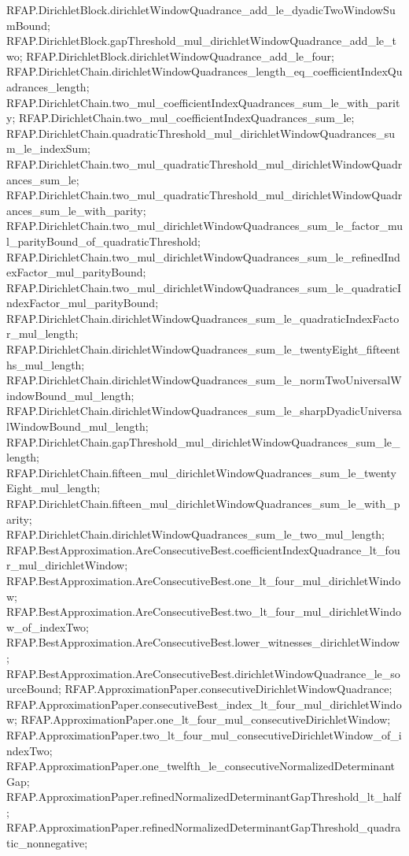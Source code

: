 \documentclass[11pt]{article}
\begin{document}
{RFAP.DirichletBlock.dirichletWindowQuadrance_add_le_dyadicTwoWindowSumBound;
RFAP.DirichletBlock.gapThreshold_mul_dirichletWindowQuadrance_add_le_two;
RFAP.DirichletBlock.dirichletWindowQuadrance_add_le_four;
RFAP.DirichletChain.dirichletWindowQuadrances_length_eq_coefficientIndexQuadrances_length;
RFAP.DirichletChain.two_mul_coefficientIndexQuadrances_sum_le_with_parity;
RFAP.DirichletChain.two_mul_coefficientIndexQuadrances_sum_le;
RFAP.DirichletChain.quadraticThreshold_mul_dirichletWindowQuadrances_sum_le_indexSum;
RFAP.DirichletChain.two_mul_quadraticThreshold_mul_dirichletWindowQuadrances_sum_le;
RFAP.DirichletChain.two_mul_quadraticThreshold_mul_dirichletWindowQuadrances_sum_le_with_parity;
RFAP.DirichletChain.two_mul_dirichletWindowQuadrances_sum_le_factor_mul_parityBound_of_quadraticThreshold;
RFAP.DirichletChain.two_mul_dirichletWindowQuadrances_sum_le_refinedIndexFactor_mul_parityBound;
RFAP.DirichletChain.two_mul_dirichletWindowQuadrances_sum_le_quadraticIndexFactor_mul_parityBound;
RFAP.DirichletChain.dirichletWindowQuadrances_sum_le_quadraticIndexFactor_mul_length;
RFAP.DirichletChain.dirichletWindowQuadrances_sum_le_twentyEight_fifteenths_mul_length;
RFAP.DirichletChain.dirichletWindowQuadrances_sum_le_normTwoUniversalWindowBound_mul_length;
RFAP.DirichletChain.dirichletWindowQuadrances_sum_le_sharpDyadicUniversalWindowBound_mul_length;
RFAP.DirichletChain.gapThreshold_mul_dirichletWindowQuadrances_sum_le_length;
RFAP.DirichletChain.fifteen_mul_dirichletWindowQuadrances_sum_le_twentyEight_mul_length;
RFAP.DirichletChain.fifteen_mul_dirichletWindowQuadrances_sum_le_with_parity;
RFAP.DirichletChain.dirichletWindowQuadrances_sum_le_two_mul_length;
RFAP.BestApproximation.AreConsecutiveBest.coefficientIndexQuadrance_lt_four_mul_dirichletWindow;
RFAP.BestApproximation.AreConsecutiveBest.one_lt_four_mul_dirichletWindow;
RFAP.BestApproximation.AreConsecutiveBest.two_lt_four_mul_dirichletWindow_of_indexTwo;
RFAP.BestApproximation.AreConsecutiveBest.lower_witnesses_dirichletWindow;
RFAP.BestApproximation.AreConsecutiveBest.dirichletWindowQuadrance_le_sourceBound;
RFAP.ApproximationPaper.consecutiveDirichletWindowQuadrance;
RFAP.ApproximationPaper.consecutiveBest_index_lt_four_mul_dirichletWindow;
RFAP.ApproximationPaper.one_lt_four_mul_consecutiveDirichletWindow;
RFAP.ApproximationPaper.two_lt_four_mul_consecutiveDirichletWindow_of_indexTwo;
RFAP.ApproximationPaper.one_twelfth_le_consecutiveNormalizedDeterminantGap;
RFAP.ApproximationPaper.refinedNormalizedDeterminantGapThreshold_lt_half;
RFAP.ApproximationPaper.refinedNormalizedDeterminantGapThreshold_quadratic_nonnegative;
}
\end{document}
